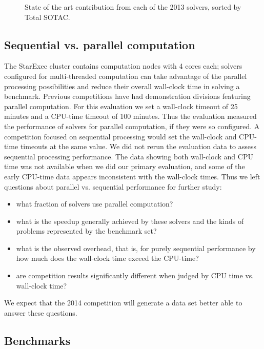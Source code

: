 \documentclass[smallcondensed]{svjour3}
\begin{document}
\begin{figure}
\centering
\begin{tabular}{|l|rrr|}
\hline

\hline
\end{tabular}
\caption{State of the art contribution from each of the 2013 solvers, sorted by Total SOTAC.}
\label{Fig:sotac}
\end{figure}

\subsection{Sequential vs. parallel computation}
\label{parallel}

The StarExec cluster contains computation nodes with 4 cores each; solvers configured for multi-threaded computation can take advantage of the parallel processing possibilities and reduce their overall wall-clock time in solving a benchmark. Previous competitions have had demonstration divisions featuring parallel computation.
For this evaluation we set a wall-clock timeout of 25 minutes and a CPU-time timeout of 100 minutes. Thus the evaluation measured the performance of solvers for parallel computation, if they were so configured. A competition focused on sequential processing would set the wall-clock and CPU-time timeouts at the same value.
We did not rerun the evaluation data to assess sequential processing performance. The data showing both wall-clock and CPU time was not available when we did our 
primary evaluation, and some of the early CPU-time data appears inconsistent with the wall-clock times. Thus we left questions about parallel vs. sequential performance for further study: 
\begin{itemize}
\item what fraction of solvers use parallel computation?
\item what is the speedup generally achieved by these solvers and the kinds of problems represented by the benchmark set?
\item what is the observed overhead, that is, for purely sequential performance by how much does the wall-clock time exceed the CPU-time?
\item are competition results significantly different when judged by CPU time vs. wall-clock time?
\end{itemize}
We expect that the 2014 competition will generate a data set better able to answer these questions.

\subsection{Benchmarks}
\label{Benchmarks}
\end{document}
